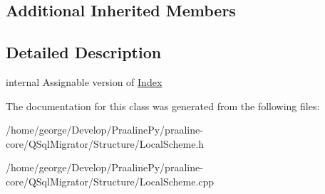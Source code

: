 \subsection*{Additional Inherited Members}


\subsection{Detailed Description}
internal Assignable version of \hyperlink{class_q_sql_migrator_1_1_structure_1_1_local_scheme_1_1_index}{Index} 

The documentation for this class was generated from the following files\+:\begin{DoxyCompactItemize}
\item 
/home/george/\+Develop/\+Praaline\+Py/praaline-\/core/\+Q\+Sql\+Migrator/\+Structure/Local\+Scheme.\+h\item 
/home/george/\+Develop/\+Praaline\+Py/praaline-\/core/\+Q\+Sql\+Migrator/\+Structure/Local\+Scheme.\+cpp\end{DoxyCompactItemize}

